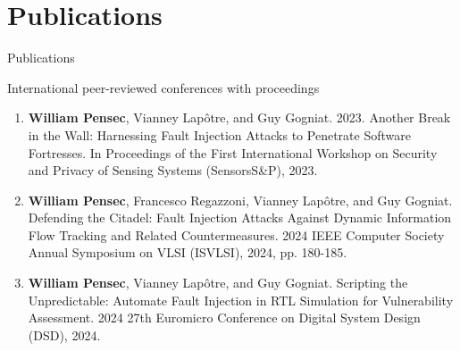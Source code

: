 \section*{Publications}

\begin{frame}[allowframebreaks]{Publications}
    \begin{block}{International peer-reviewed conferences with proceedings}
        \begin{enumerate}
            \item {\footnotesize\textbf{William Pensec}, Vianney Lapôtre, and Guy Gogniat. 2023. Another Break in the Wall: Harnessing Fault Injection Attacks to Penetrate Software Fortresses. In Proceedings of the First International Workshop on Security and Privacy of Sensing Systems (SensorsS\&P), 2023.~\cite{PLG-23-SensorsSP}}
            \item {\footnotesize\textbf{William Pensec}, Francesco Regazzoni, Vianney Lapôtre, and Guy Gogniat. Defending the Citadel: Fault Injection Attacks Against Dynamic Information Flow Tracking and Related Countermeasures. 2024 IEEE Computer Society Annual Symposium on VLSI (ISVLSI), 2024, pp. 180-185.~\cite{PRLG-24-isvlsi}}
            \item {\footnotesize\textbf{William Pensec}, Vianney Lapôtre, and Guy Gogniat. Scripting the Unpredictable: Automate Fault Injection in RTL Simulation for Vulnerability Assessment. 2024 27th Euromicro Conference on Digital System Design (DSD), 2024.~\cite{PLG-24-dsd}}
        \end{enumerate}
    \end{block}



\end{frame}
